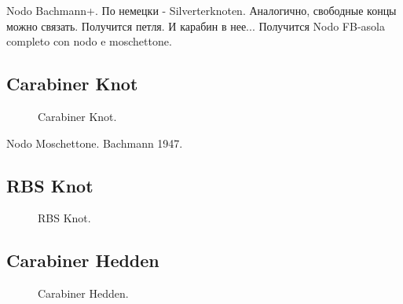 Nodo Bachmann+. По немецки - Silverterknoten. Аналогично, свободные концы можно связать. Получится петля. И карабин в нее... Получится Nodo FB-asola completo con nodo e moschettone.

\subsection{Carabiner Knot}

\begin{figure}[H]\centering
	\begin{minipage}{1\linewidth}
		\begin{center}
			\tcbox[enhanced jigsaw,colframe=black,opacityframe=0.5,opacityback=0.5]
			{\centering{}}
		\end{center}
	\end{minipage}
\caption{Carabiner Knot.}
\label{ris:Carabiner_Knot}
\end{figure}

Nodo Moschettone. Bachmann 1947.

\subsection{RBS Knot}

\begin{figure}[H]\centering
	\begin{minipage}{1\linewidth}
		\begin{center}
			\tcbox[enhanced jigsaw,colframe=black,opacityframe=0.5,opacityback=0.5]
			{\centering{}}
		\end{center}
	\end{minipage}
\caption{RBS Knot.}
\label{ris:RBS_Knot}
\end{figure}

\subsection{Carabiner Hedden}

\begin{figure}[H]\centering
\end{figure}
\begin{figure}[H]\centering
	\caption{Carabiner Hedden.}\label{ris:Carabiner_Hedden}
\end{figure}

